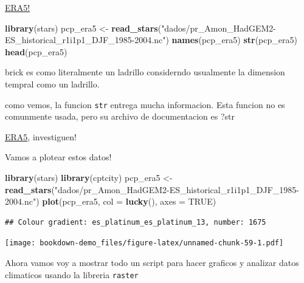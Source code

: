 \documentclass[]{book}
\newenvironment{Shaded}{\begin{snugshade}}{\end{snugshade}}
\newcommand{\DataTypeTok}[1]{\textcolor[rgb]{0.13,0.29,0.53}{#1}}
\newcommand{\KeywordTok}[1]{\textcolor[rgb]{0.13,0.29,0.53}{\textbf{#1}}}
\newcommand{\NormalTok}[1]{#1}
\newcommand{\OtherTok}[1]{\textcolor[rgb]{0.56,0.35,0.01}{#1}}
\newcommand{\StringTok}[1]{\textcolor[rgb]{0.31,0.60,0.02}{#1}}
\begin{document}
\href{https://www.ecmwf.int/en/forecasts/datasets/reanalysis-datasets/era5}{ERA5!}

\begin{Shaded}
\begin{Highlighting}[]
\KeywordTok{library}\NormalTok{(stars)}
\NormalTok{pcp_era5 <-}\StringTok{ }\KeywordTok{read_stars}\NormalTok{(}\StringTok{"dados/pr_Amon_HadGEM2-ES_historical_r1i1p1_DJF_1985-2004.nc"}\NormalTok{)}
\KeywordTok{names}\NormalTok{(pcp_era5)}
\KeywordTok{str}\NormalTok{(pcp_era5)}
\KeywordTok{head}\NormalTok{(pcp_era5)}
\end{Highlighting}
\end{Shaded}

brick es como literalmente un ladrillo considerndo usualmente la dimension tempral como un ladrillo.

como vemos, la funcion \texttt{str} entrega mucha informacion. Esta funcion no es comunmente usada, pero su archivo de documentacion es ?str

\href{https://www.ecmwf.int/en/forecasts/datasets/reanalysis-datasets/era5}{ERA5}, investiguen!

Vamos a plotear estos datos!

\begin{Shaded}
\begin{Highlighting}[]
\KeywordTok{library}\NormalTok{(stars)}
\KeywordTok{library}\NormalTok{(cptcity)}
\NormalTok{pcp_era5 <-}\StringTok{ }\KeywordTok{read_stars}\NormalTok{(}\StringTok{"dados/pr_Amon_HadGEM2-ES_historical_r1i1p1_DJF_1985-2004.nc"}\NormalTok{)}
\KeywordTok{plot}\NormalTok{(pcp_era5,}
    \DataTypeTok{col =} \KeywordTok{lucky}\NormalTok{(),}
     \DataTypeTok{axes =} \OtherTok{TRUE}\NormalTok{)}
\end{Highlighting}
\end{Shaded}

\begin{verbatim}
## Colour gradient: es_platinum_es_platinum_13, number: 1675
\end{verbatim}

\texttt{[image: bookdown-demo\_files/figure-latex/unnamed-chunk-59-1.pdf]}

Ahora vamos voy a mostrar todo un script para hacer graficos y analizar datos climaticos usando la libreria \texttt{raster}
\end{document}
